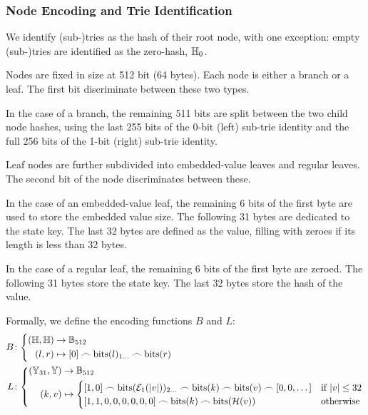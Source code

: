 \subsubsection{Node Encoding and Trie Identification}
We identify (sub-)tries as the hash of their root node, with one exception: empty (sub-)tries are identified as the zero-hash, $\mathbb{H}_0$.

Nodes are fixed in size at 512 bit (64 bytes). Each node is either a branch or a leaf. The first bit discriminate between these two types.

In the case of a branch, the remaining 511 bits are split between the two child node hashes, using the last 255 bits of the 0-bit (left) sub-trie identity and the full 256 bits of the 1-bit (right) sub-trie identity.

Leaf nodes are further subdivided into embedded-value leaves and regular leaves. The second bit of the node discriminates between these.

In the case of an embedded-value leaf, the remaining 6 bits of the first byte are used to store the embedded value size. The following 31 bytes are dedicated to the state key. The last 32 bytes are defined as the value, filling with zeroes if its length is less than 32 bytes.

In the case of a regular leaf, the remaining 6 bits of the first byte are zeroed. The following 31 bytes store the state key. The last 32 bytes store the hash of the value.

Formally, we define the encoding functions $B$ and $L$:
\begin{align}
  B&\colon\abracegroup{
    (\hash, \hash) &\to \bitstringoflen{512}\\
    (l, r) &\mapsto [0] \concat \text{bits}(l)\interval{1}{} \concat \text{bits}(r)
  }\\
  L&\colon\abracegroup{
    (\bloboflen{31}, \blob) &\to \bitstringoflen{512}\\
    (k, v) &\mapsto \begin{cases}
      [1, 0] \concat \text{bits}(\fixedencode{1}{\len{v}})\interval{2}{} \concat \text{bits}(k) \concat \text{bits}(v) \concat [0, 0, \dots] &\when \len{v} \le 32\\
      [1, 1, 0, 0, 0, 0, 0, 0] \concat \text{bits}(k) \concat \text{bits}(\blake(v)) &\otherwise
    \end{cases}
  }
\end{align}

